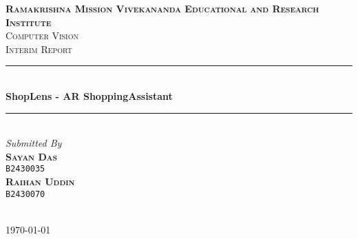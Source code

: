 \begin{titlepage}
	\newcommand{\HRule}{\rule{\linewidth}{0.5mm}}
	\center


	\textsc{\LARGE \textbf{Ramakrishna Mission Vivekananda Educational and Research Institute}}\\[1.5cm]

	\textsc{\LARGE Computer Vision}\\[0.5cm]

	\textsc{\large Interim Report}\\[0.5cm]

	\HRule\\[0.4cm]

	{\huge\bfseries ShopLens - AR ShoppingAssistant}\\[0.4cm]

	\HRule\\[1.5cm]



\large
\textit{Submitted By}\\
\textsc{\textbf{Sayan Das }}\\
\vspace{-0.5em}
\textsc{\texttt{B2430035 }}\\
\textsc{\textbf{Raihan Uddin }}\\
\vspace{-0.5em}
\textsc{\texttt{B2430070 }}\\

	~
	\begin{minipage}{0.4\textwidth}
	\end{minipage}


	\vfill\vfill\vfill

	{\large \today}

	\vfill

\end{titlepage}
\restoregeometry